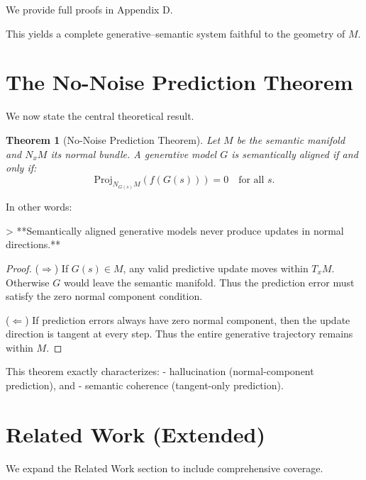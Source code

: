 \documentclass[11pt,a4paper,twocolumn]{article}
\newtheorem{theorem}{Theorem}[section]
\begin{document}
We provide full proofs in Appendix D.

This yields a complete generative–semantic system faithful to the
geometry of $M$.



\section{The No-Noise Prediction Theorem}

We now state the central theoretical result.

\begin{theorem}[No-Noise Prediction Theorem]
Let $M$ be the semantic manifold and $N_x M$ its normal bundle.
A generative model $G$ is semantically aligned if and only if:
\[
\mathrm{Proj}_{N_{G(s)} M}(f(G(s))) = 0
\quad
\text{for all $s$.}
\]
\end{theorem}

In other words:

> **Semantically aligned generative models never produce updates in normal directions.**

\begin{proof}
($\Rightarrow$) If $G(s) \in M$, any valid predictive update moves within $T_x M$.
Otherwise $G$ would leave the semantic manifold.  
Thus the prediction error must satisfy the zero normal component condition.  

($\Leftarrow$) If prediction errors always have zero normal component,
then the update direction is tangent at every step.  
Thus the entire generative trajectory remains within $M$.
\end{proof}

This theorem exactly characterizes:
- hallucination (normal-component prediction), and  
- semantic coherence (tangent-only prediction).  



\section{Related Work (Extended)}

We expand the Related Work section to include comprehensive coverage.
\end{document}
